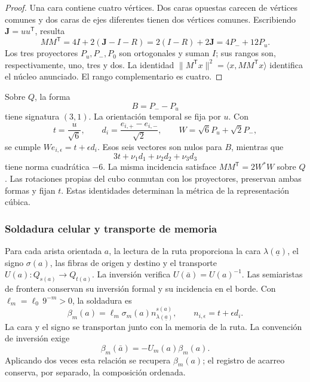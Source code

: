 \begin{proof}
Una cara contiene cuatro vértices. Dos caras opuestas carecen de vértices
comunes y dos caras de ejes diferentes tienen dos vértices comunes.
Escribiendo \(\mathbf J=uu^{\mathsf T}\), resulta
\[
 MM^{\mathsf T}=4I+2(\mathbf J-I-R)
 =2(I-R)+2\mathbf J=4P_-+12P_u.
\]
Los tres proyectores \(P_u,P_-,P_0\) son ortogonales y suman \(I\);
sus rangos son, respectivamente, uno, tres y dos. La identidad
\(\|M^{\mathsf T}x\|^2=\langle x,MM^{\mathsf T}x\rangle\)
identifica el núcleo anunciado. El rango complementario es cuatro.
\end{proof}

Sobre \(Q\), la forma
\[
 B=P_--P_u
\]
tiene signatura \((3,1)\). La orientación temporal se fija por \(u\).
Con
\[
 t=\frac{u}{\sqrt6},\qquad
 d_i=\frac{e_{i,+}-e_{i,-}}{\sqrt2},\qquad
 W=\sqrt6P_u+\sqrt2P_-,
\]
se cumple \(We_{i,\epsilon}=t+\epsilon d_i\). Esos seis vectores
son nulos para \(B\), mientras que
\[
 3t+\nu_1d_1+\nu_2d_2+\nu_3d_3
\]
tiene norma cuadrática \(-6\). La misma incidencia satisface
\(MM^{\mathsf T}=2W^*W\) sobre \(Q\). Las rotaciones propias del cubo
conmutan con los proyectores, preservan ambas formas y fijan \(t\).
Estas identidades determinan la métrica de la representación cúbica.

\subsubsection{Soldadura celular y transporte de memoria}
\label{vii:sec:soldadura-celular}

Para cada arista orientada \(a\), la lectura de la ruta proporciona
la cara \(\lambda(\underline a)\), el signo
\(\sigma(a)\), las fibras de origen y destino y el transporte
\(U(a):Q_{s(a)}\longrightarrow Q_{t(a)}\).
La inversión verifica \(U(\bar a)=U(a)^{-1}\).
Las semiaristas de frontera conservan su inversión formal y su incidencia
en el borde. Con \(\ell_m=\ell_0\,9^{-m}>0\), la soldadura es
\begin{equation}
 \beta_m(a)=\ell_m\sigma_m(a)
              n_{\lambda(\underline a)}^{s(a)},\qquad
 n_{i,\epsilon}=t+\epsilon d_i.
 \label{vii:eq:soldadura-arista}
\end{equation}
La cara y el signo se transportan junto con la memoria de la ruta.
La convención de inversión exige
\begin{equation}
 \beta_m(\bar a)=-U_m(a)\beta_m(a).
 \label{vii:eq:inversion-soldadura}
\end{equation}
Aplicando dos veces esta relación se recupera \(\beta_m(a)\);
el registro de acarreo conserva, por separado, la composición ordenada.

